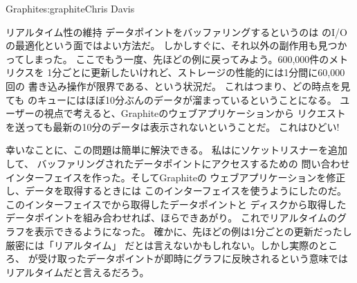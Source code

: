 \begin{aosachapter}{Graphite}{s:graphite}{Chris Davis}
\begin{aosasect1}{リアルタイム性の維持}
データポイントをバッファリングするというのは
のI/Oの最適化という面ではよい方法だ。
しかしすぐに、それ以外の副作用も見つかってしまった。
ここでもう一度、先ほどの例に戻ってみよう。600,000件のメトリクスを
1分ごとに更新したいけれど、ストレージの性能的には1分間に60,000回の
書き込み操作が限界である、という状況だ。
これはつまり、どの時点を見ても
のキューにはほぼ10分ぶんのデータが溜まっているということになる。
ユーザーの視点で考えると、Graphiteのウェブアプリケーションから
リクエストを送っても最新の10分のデータは表示されないということだ。
これはひどい!

幸いなことに、この問題は簡単に解決できる。
私はにソケットリスナーを追加して、
バッファリングされたデータポイントにアクセスするための
問い合わせインターフェイスを作った。そしてGraphiteの
ウェブアプリケーションを修正し、データを取得するときには
このインターフェイスを使うようにしたのだ。
このインターフェイスでから取得したデータポイントと
ディスクから取得したデータポイントを組み合わせれば、ほらできあがり。
これでリアルタイムのグラフを表示できるようになった。
確かに、先ほどの例は1分ごとの更新だったし厳密には「リアルタイム」
だとは言えないかもしれない。しかし実際のところ、
が受け取ったデータポイントが即時にグラフに反映されるという意味では
リアルタイムだと言えるだろう。


\end{aosasect1}
\end{aosachapter}
